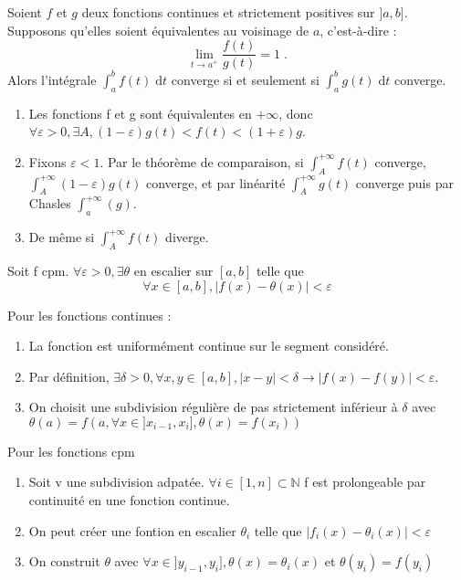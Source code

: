 \documentclass[french]{yLectureNote}
\newcommand{\N}[0]{\mathbb{N}}
\newcommand{\dd}[0]{\mathrm{d}}
\begin{document}
\begin{theorem}
 Soient $f$ et $g$ deux fonctions continues et strictement positives sur
$]a,b]$.
Supposons qu'elles soient équivalentes au voisinage de $a$, c'est-à-dire :
$$\lim_{t\rightarrow a^+}\frac{f(t)}{g(t)} = 1\;.$$
Alors l'intégrale $\int_a^b f(t)\;\dd t$ converge si et seulement si
$\int_a^b g(t)\;\dd t$ converge.
\end{theorem}
\begin{myproof}
\begin{enumerate}
 \item  Les fonctions f et g sont équivalentes en \(+\infty\), donc \(\forall \varepsilon >0, \exists A, (1-\varepsilon)g(t)<f(t)<(1+\varepsilon)g\).
 \item Fixons \(\varepsilon <1\). Par le théorème de comparaison, si \(\int_A^{+\infty} f(t)\) converge, \(\int_A^{+\infty} (1-\varepsilon)g(t)\) converge, et par linéarité \(\int_A^{+\infty} g(t)\) converge puis par Chasles \(\int_a^{+\infty} (g)\).
 \item De m\^eme si \(\int_A^{+\infty} f(t)\) diverge.
\end{enumerate}
\end{myproof}
\begin{theorem}
 Soit f cpm. \(\forall \varepsilon>0,\exists \theta\) en escalier sur \([a,b]\) telle que \[\forall x\in[a,b],|f(x)-\theta(x)|<\varepsilon\]
\end{theorem}
\begin{myproof}
 Pour les fonctions continues :
 \begin{enumerate}
  \item La fonction est uniformément continue sur le segment considéré.
  \item Par définition, \(\exists \delta >0, \forall x,y \in[a,b], |x-y|<\delta \rightarrow |f(x)-f(y)|<\varepsilon\).
  \item On choisit une subdivision régulière de pas strictement inférieur à \(\delta\) avec \(\theta(a) = f(a, \forall x\in ]x_{i-1},x_i], \theta(x)=f(x_i))\)
 \end{enumerate}
Pour les fonctions cpm
\begin{enumerate}
 \item Soit v une subdivision adpatée. \(\forall i\in[1,n]\subset \N\) f est prolongeable par continuité en une fonction continue.
 \item On peut créer une fontion en escalier \(\theta_i\) telle que \(|f_i(x)-\theta_i(x)|<\varepsilon\)
 \item On construit \(\theta\) avec \(\forall x\in]y_{i-1}, y_i], \theta(x) = \theta_i(x)\) et \(\theta(y_i) = f(y_i)\)
\end{enumerate}
\end{myproof}
\end{document}
